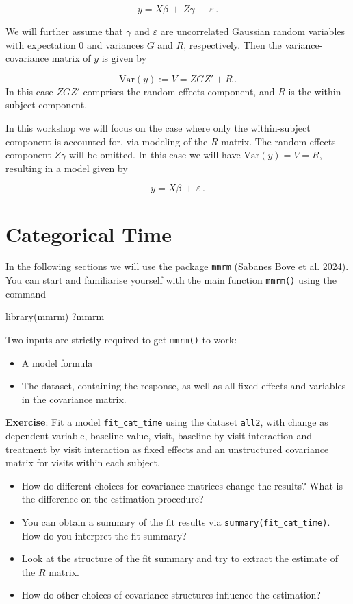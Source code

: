 \documentclass[
  letterpaper,
  DIV=11,
  numbers=noendperiod]{scrreprt}
\newenvironment{Shaded}{\begin{snugshade}}{\end{snugshade}}
\newcommand{\FunctionTok}[1]{\textcolor[rgb]{0.28,0.35,0.67}{#1}}
\newcommand{\NormalTok}[1]{\textcolor[rgb]{0.00,0.23,0.31}{#1}}
\begin{document}
\[
y = X\beta\,+\,Z\gamma\,+\,\varepsilon\,.
\]

We will further assume that \(\gamma\) and \(\varepsilon\) are
uncorrelated Gaussian random variables with expectation \(0\) and
variances \(G\) and \(R\), respectively. Then the variance-covariance
matrix of \(y\) is given by

\[
\text{Var}(y) := V = ZGZ' + R\,.
\] In this case \(ZGZ'\) comprises the random effects component, and
\(R\) is the within-subject component.

In this workshop we will focus on the case where only the within-subject
component is accounted for, via modeling of the \(R\) matrix. The random
effects component \(Z\gamma\) will be omitted. In this case we will have
\(\text{Var}(y) = V = R\), resulting in a model given by

\[
y = X\beta\,+\,\varepsilon\,.
\]

\hypertarget{categorical-time}{%
\section{Categorical Time}\label{categorical-time}}

In the following sections we will use the package \texttt{mmrm} (Sabanes
Bove et al. 2024). You can start and familiarise yourself with the main
function \texttt{mmrm()} using the command

\begin{Shaded}
\begin{Highlighting}[]
\FunctionTok{library}\NormalTok{(mmrm)}
\NormalTok{?mmrm}
\end{Highlighting}
\end{Shaded}

Two inputs are strictly required to get \texttt{mmrm()} to work:

\begin{itemize}
\item
  A model formula
\item
  The dataset, containing the response, as well as all fixed effects and
  variables in the covariance matrix.
\end{itemize}

\textbf{Exercise}: Fit a model \texttt{fit\_cat\_time} using the dataset
\texttt{all2}, with change as dependent variable, baseline value, visit,
baseline by visit interaction and treatment by visit interaction as
fixed effects and an unstructured covariance matrix for visits within
each subject.

\begin{itemize}
\item
  How do different choices for covariance matrices change the results?
  What is the difference on the estimation procedure?
\item
  You can obtain a summary of the fit results via
  \texttt{summary(fit\_cat\_time)}. How do you interpret the fit
  summary?
\item
  Look at the structure of the fit summary and try to extract the
  estimate of the \(R\) matrix.
\item
  How do other choices of covariance structures influence the
  estimation?
\end{itemize}
\end{document}
